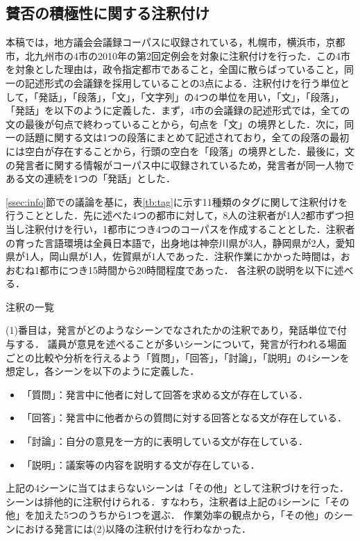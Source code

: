 \documentclass[japanese]{jnlp_1.4}
\begin{document}
\subsection{賛否の積極性に関する注釈付け}
\label{ssec:huyo}

本稿では，地方議会会議録コーパスに収録されている，札幌市，横浜市，京都市，北九州市の4市の2010年の第2回定例会を対象に注釈付けを行った．この4市を対象とした理由は，政令指定都市であること，全国に散らばっていること，同一の記述形式の会議録を採用していることの3点による．注釈付けを行う単位として，「発話」，「段落」，「文」，「文字列」の4つの単位を用い，「文」，「段落」，「発話」を以下のように定義した．まず，4市の会議録の記述形式では，全ての文の最後が句点で終わっていることから，句点を「文」の境界とした．次に，同一の話題に関する文は1つの段落にまとめて記述されており，全ての段落の最初には空白が存在することから，行頭の空白を「段落」の境界とした．最後に，文の発言者に関する情報がコーパス中に収録されているため，発言者が同一人物である文の連続を1つの「発話」とした．

\ref{ssec:info}節での議論を基に，表\ref{tb:tag}に示す11種類のタグに関して注釈付けを行うこととした．先に述べた4つの都市に対して，8人の注釈者が1人2都市ずつ担当し注釈付けを行い，1都市につき4つのコーパスを作成することとした．注釈者の育った言語環境は全員日本語で，出身地は神奈川県が3人，静岡県が2人，愛知県が1人，岡山県が1人，佐賀県が1人であった．注釈作業にかかった時間は，おおむね1都市につき15時間から20時間程度であった．
各注釈の説明を以下に述べる．

\begin{table}[b]
 \caption{注釈の一覧}
 \label{tb:tag}

\end{table}

(1)番目は，発言がどのようなシーンでなされたかの注釈であり，発話単位で付与する．
議員が意見を述べることが多いシーンについて，発言が行われる場面ごとの比較や分析を行えるよう「質問」，「回答」，「討論」，「説明」の4シーンを想定し，各シーンを以下のように定義した．

\begin{itemize}
\item 「質問」：発言中に他者に対して回答を求める文が存在している．
\item 「回答」：発言中に他者からの質問に対する回答となる文が存在している．
\item 「討論」：自分の意見を一方的に表明している文が存在している．
\item 「説明」：議案等の内容を説明する文が存在している．
\end{itemize}
上記の4シーンに当てはまらないシーンは「その他」として注釈づけを行った．シーンは排他的に注釈付けられる．すなわち，注釈者は上記の4シーンに「その他」を加えた5つのうちから1つを選ぶ．
作業効率の観点から，「その他」のシーンにおける発言には(2)以降の注釈付けを行わなかった．
\end{document}
